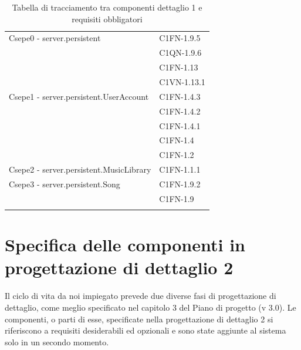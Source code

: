 \begin{footnotesize}
\begin{longtable}[!h]{|l|l|}
Csepe0 - server.persistent & C1FN-1.9.5 \\
& C1QN-1.9.6 \\
& C1FN-1.13 \\
& C1VN-1.13.1 \\\hline
Csepe1 - server.persistent.UserAccount & C1FN-1.4.3 \\
& C1FN-1.4.2 \\
& C1FN-1.4.1 \\
& C1FN-1.4 \\
& C1FN-1.2 \\\hline
Csepe2 - server.persistent.MusicLibrary &  C1FN-1.1.1 \\\hline
Csepe3 - server.persistent.Song & C1FN-1.9.2 \\
& C1FN-1.9 \\\hline
\caption{Tabella di tracciamento tra componenti dettaglio 1 e requisiti
obbligatori}
\end{longtable}
\end{footnotesize}

\chapter{Specifica delle componenti in progettazione di dettaglio 2}
\thispagestyle{fancy} %
Il ciclo di vita da noi impiegato prevede due diverse fasi di progettazione di
dettaglio, come meglio specificato nel capitolo 3 del Piano di progetto (v
3.0). Le componenti, o parti di esse, specificate nella progettazione di
dettaglio 2 si riferiscono a requisiti desiderabili ed opzionali e sono state
aggiunte al sistema solo in un secondo momento. 
